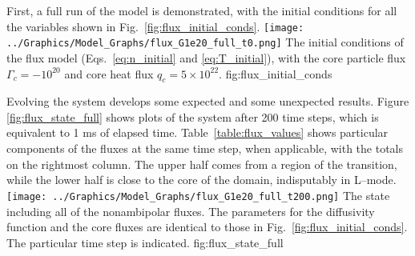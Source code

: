 First, a full run of the model is demonstrated, with the initial conditions for all the variables shown in Fig.~\ref{fig:flux_initial_conds}.
	{\texttt{[image: ../Graphics/Model\_Graphs/flux\_G1e20\_full\_t0.png]}}
	{The initial conditions of the flux model (Eqs.~\ref{eq:n_initial} and \ref{eq:T_initial}), with the core particle flux $\Gamma_c = -10^{20}$ and core heat flux $q_c = 5\times 10^{22}$.}
	{fig:flux_initial_conds}

Evolving the system develops some expected and some unexpected results.
Figure \ref{fig:flux_state_full} shows plots of the system after 200 time steps, which is equivalent to 1 ms of elapsed time.
Table~\ref{table:flux_values} shows particular components of the fluxes at the same time step, when applicable, with the totals on the rightmost column.
The upper half comes from a region of the transition, while the lower half is close to the core of the domain, indisputably in L--mode.
	{\texttt{[image: ../Graphics/Model\_Graphs/flux\_G1e20\_full\_t200.png]}}
	{The state including all of the nonambipolar fluxes.
	The parameters for the diffusivity function and the core fluxes are identical to those in Fig.~\ref{fig:flux_initial_conds}.
	The particular time step is indicated.}
	{fig:flux_state_full}

